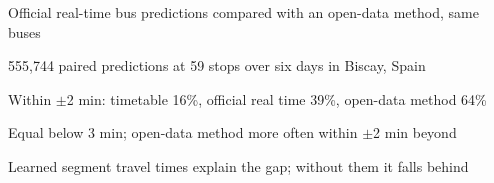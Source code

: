 \begin{highlights}
\item Official real-time bus predictions compared with an open-data method, same buses
\item 555,744 paired predictions at 59 stops over six days in Biscay, Spain
\item Within $\pm$2 min: timetable 16\%, official real time 39\%, open-data method 64\%
\item Equal below 3 min; open-data method more often within $\pm$2 min beyond
\item Learned segment travel times explain the gap; without them it falls behind
\end{highlights}
